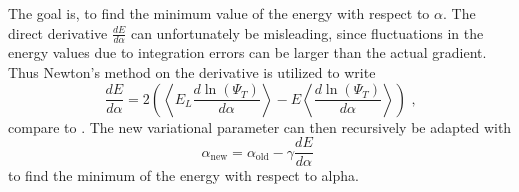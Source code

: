 The goal is, to find the minimum value of the energy with respect to $\alpha$. The direct derivative $\frac{dE}{d\alpha}$ can unfortunately be misleading, since fluctuations in the energy values due to integration errors can be larger than the actual gradient. Thus Newton's method on the derivative is utilized to write
$$\frac{dE}{d\alpha} = 2 \left( \left< E_L \frac{d \ln(\Psi_T)}{d \alpha} \right> - E\left<\frac{d \ln(\Psi_T)}{d \alpha}\right> \right) \text{~,}$$
compare to \cite{JosBook}.
The new variational parameter can then recursively be adapted with $$\alpha_{\text{new}} = \alpha_{\text{old}} - \gamma \frac{dE}{d\alpha} \text{~} $$
to find the minimum of the energy with respect to alpha.



